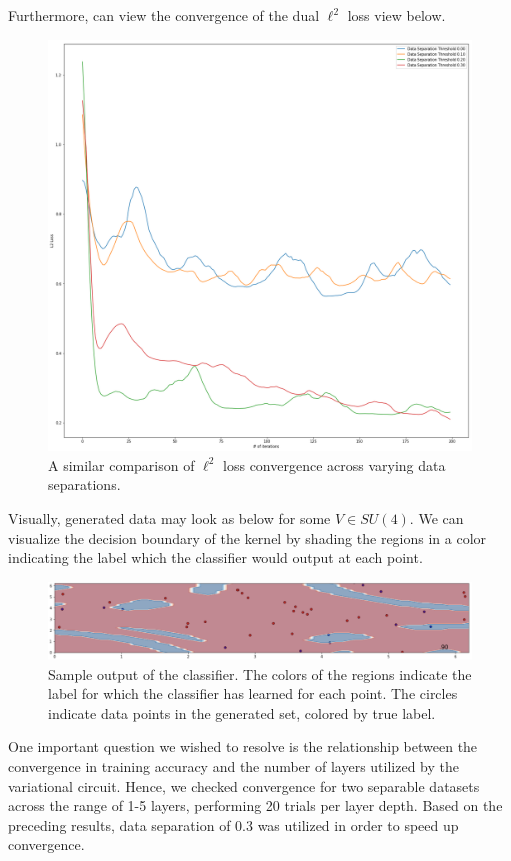 \documentclass[main.tex]{subfiles}
\begin{document}
Furthermore, can view the convergence of the dual $\ell^2$ loss view below.

\begin{figure}[H]
\centering
\includegraphics[width=\textwidth]{images/l2_loss_conv}	
\caption{A similar comparison of $\ell^2$ loss convergence across varying data separations.}
\end{figure}

Visually, generated data may look as below for some $V \in SU(4)$. We can visualize the decision boundary of the kernel by shading the regions in a color indicating the label which the classifier would output at each point.

\begin{figure}[H]
\includegraphics[width=\textwidth]{images/separable_data}
\caption{Sample output of the classifier. The colors of the regions indicate the label for which the classifier has learned for each point. The circles indicate data points in the generated set, colored by true label.}
\end{figure}

One important question we wished to resolve is the relationship between the convergence in training accuracy and the number of layers utilized by the variational circuit. Hence, we checked convergence for two separable datasets across the range of 1-5 layers, performing 20 trials per layer depth. Based on the preceding results, data separation of 0.3 was utilized in order to speed up convergence.
\end{document}
